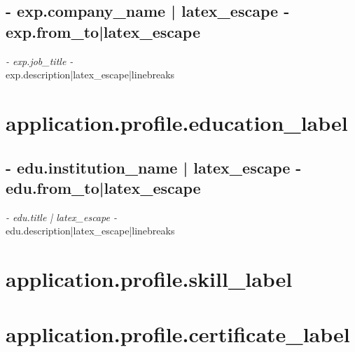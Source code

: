 \documentclass[a4paper, {{ - application.profile.latex_pt - }}pt]{report}
\begin{document}
{{{{{{{{{{\subsection*{ {{ - exp.company_name | latex_escape - }} \hfill {{ exp.from_to|latex_escape }}  }
\textit{ {{ - exp.job_title - }} } \vspace{3mm} \\
{{ exp.description|latex_escape|linebreaks }}
{%
{%

{%
\section*{ {{ application.profile.education_label }}}
{%
\subsection*{ {{ - edu.institution_name | latex_escape - }} \hfill {{ edu.from_to|latex_escape }} }
\textit{ {{ - edu.title | latex_escape - }} } \vspace{3mm} \\
{{ edu.description|latex_escape|linebreaks }}
{%
{%

{%
\section*{ {{ application.profile.skill_label }}}
\begin{center}
\end{center}
{%

{%
\section*{ {{ application.profile.certificate_label }}}
{%

}}}}}}}}}}}}}}}}}}}}
\end{document}
